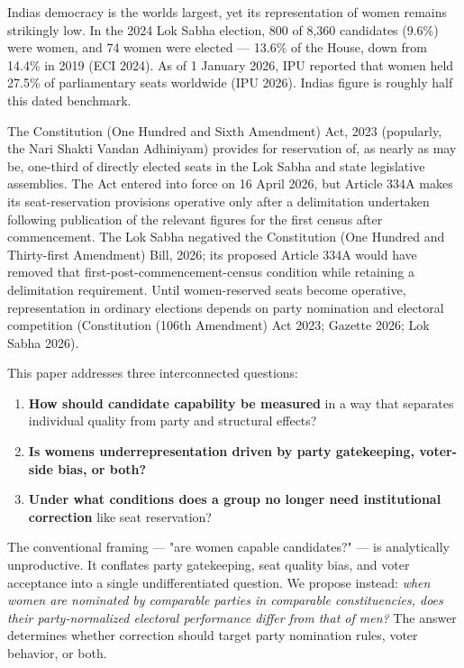 \documentclass[
]{article}
\providecommand{\tightlist}{%
  \setlength{\itemsep}{0pt}\setlength{\parskip}{0pt}}
\begin{document}
India\textquotesingle s democracy is the world\textquotesingle s largest, yet its representation of women remains strikingly low. In the 2024 Lok Sabha election, 800 of 8,360 candidates (9.6\%) were women, and 74 women were elected --- 13.6\% of the House, down from 14.4\% in 2019 (ECI 2024). As of 1 January 2026, IPU reported that women held 27.5\% of parliamentary seats worldwide (IPU 2026). India\textquotesingle s figure is roughly half this dated benchmark.

The Constitution (One Hundred and Sixth Amendment) Act, 2023 (popularly, the Nari Shakti Vandan Adhiniyam) provides for reservation of, as nearly as may be, one-third of directly elected seats in the Lok Sabha and state legislative assemblies. The Act entered into force on 16 April 2026, but Article 334A makes its seat-reservation provisions operative only after a delimitation undertaken following publication of the relevant figures for the first census after commencement. The Lok Sabha negatived the Constitution (One Hundred and Thirty-first Amendment) Bill, 2026; its proposed Article 334A would have removed that first-post-commencement-census condition while retaining a delimitation requirement. Until women-reserved seats become operative, representation in ordinary elections depends on party nomination and electoral competition (Constitution (106th Amendment) Act 2023; Gazette 2026; Lok Sabha 2026).

This paper addresses three interconnected questions:

\begin{enumerate}
\def\labelenumi{\arabic{enumi}.}
\tightlist
\item
  \textbf{How should candidate capability be measured} in a way that separates individual quality from party and structural effects?
\item
  \textbf{Is women\textquotesingle s underrepresentation driven by party gatekeeping, voter-side bias, or both?}
\item
  \textbf{Under what conditions does a group no longer need institutional correction} like seat reservation?
\end{enumerate}

The conventional framing --- "are women capable candidates?" --- is analytically unproductive. It conflates party gatekeeping, seat quality bias, and voter acceptance into a single undifferentiated question. We propose instead: \emph{when women are nominated by comparable parties in comparable constituencies, does their party-normalized electoral performance differ from that of men?} The answer determines whether correction should target party nomination rules, voter behavior, or both.
\end{document}
